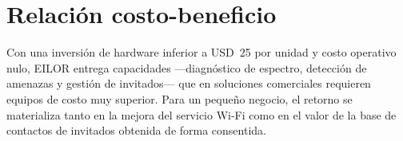 \section{Relación costo-beneficio}
Con una inversión de hardware inferior a USD~25 por unidad y costo operativo nulo, EILOR entrega capacidades ---diagnóstico de espectro, detección de amenazas y gestión de invitados--- que en soluciones comerciales requieren equipos de costo muy superior. Para un pequeño negocio, el retorno se materializa tanto en la mejora del servicio Wi\nobreakdash-Fi como en el valor de la base de contactos de invitados obtenida de forma consentida.
